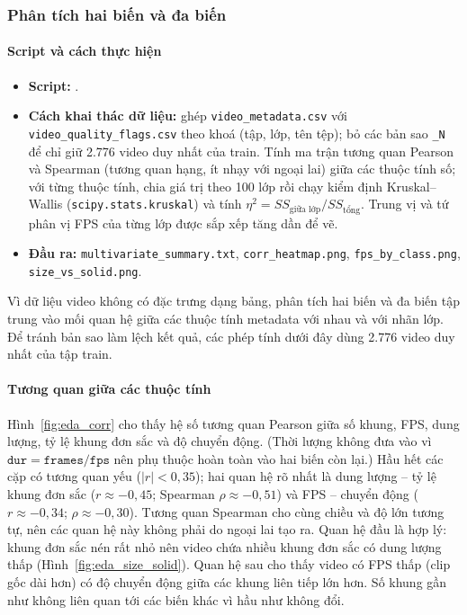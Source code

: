 \subsubsection{Phân tích hai biến và đa biến}
\label{subsec:eda_multi}

\paragraph{Script và cách thực hiện}
\begin{itemize}
  \item \textbf{Script:} .
  \item \textbf{Cách khai thác dữ liệu:} ghép \texttt{video\_metadata.csv} với \texttt{video\_quality\_flags.csv} theo khoá (tập, lớp, tên tệp); bỏ các bản sao \texttt{\_N} để chỉ giữ 2.776 video duy nhất của train. Tính ma trận tương quan Pearson và Spearman (tương quan hạng, ít nhạy với ngoại lai) giữa các thuộc tính số; với từng thuộc tính, chia giá trị theo 100 lớp rồi chạy kiểm định Kruskal--Wallis (\texttt{scipy.stats.kruskal}) và tính $\eta^2 = SS_{\text{giữa lớp}}/SS_{\text{tổng}}$. Trung vị và tứ phân vị FPS của từng lớp được sắp xếp tăng dần để vẽ.
  \item \textbf{Đầu ra:} \texttt{multivariate\_summary.txt}, \texttt{corr\_heatmap.png}, \texttt{fps\_by\_class.png}, \texttt{size\_vs\_solid.png}.
\end{itemize}

Vì dữ liệu video không có đặc trưng dạng bảng, phân tích hai biến và đa biến tập trung vào mối quan hệ giữa các thuộc tính metadata với nhau và với nhãn lớp. Để tránh bản sao làm lệch kết quả, các phép tính dưới đây dùng 2.776 video duy nhất của tập train.

\paragraph{Tương quan giữa các thuộc tính} Hình~\ref{fig:eda_corr} cho thấy hệ số tương quan Pearson giữa số khung, FPS, dung lượng, tỷ lệ khung đơn sắc và độ chuyển động. (Thời lượng không đưa vào vì $\texttt{dur}=\texttt{frames}/\texttt{fps}$ nên phụ thuộc hoàn toàn vào hai biến còn lại.) Hầu hết các cặp có tương quan yếu ($|r|<0{,}35$); hai quan hệ rõ nhất là dung lượng -- tỷ lệ khung đơn sắc ($r\approx-0{,}45$; Spearman $\rho\approx-0{,}51$) và FPS -- chuyển động ($r\approx-0{,}34$; $\rho\approx-0{,}30$). Tương quan Spearman cho cùng chiều và độ lớn tương tự, nên các quan hệ này không phải do ngoại lai tạo ra. Quan hệ đầu là hợp lý: khung đơn sắc nén rất nhỏ nên video chứa nhiều khung đơn sắc có dung lượng thấp (Hình~\ref{fig:eda_size_solid}). Quan hệ sau cho thấy video có FPS thấp (clip gốc dài hơn) có độ chuyển động giữa các khung liên tiếp lớn hơn. Số khung gần như không liên quan tới các biến khác vì hầu như không đổi.

